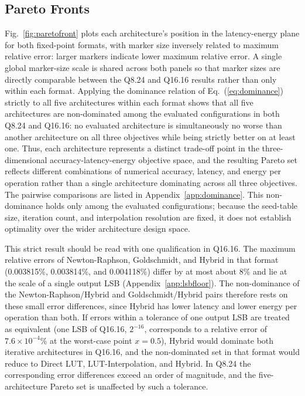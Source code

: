 \documentclass[manuscript,screen,review]{acmart}
\begin{document}
\subsection{Pareto Fronts}

Fig.~\ref{fig:paretofront} plots each architecture's position in the latency-energy plane for both fixed-point formats, with marker size inversely related to maximum relative error: larger markers indicate lower maximum relative error. A single global marker-size scale is shared across both panels so that marker sizes are directly comparable between the Q8.24 and Q16.16 results rather than only within each format. Applying the dominance relation of Eq.~(\ref{eq:dominance}) strictly to all five architectures within each format shows that all five architectures are non-dominated among the evaluated configurations in both Q8.24 and Q16.16: no evaluated architecture is simultaneously no worse than another architecture on all three objectives while being strictly better on at least one. Thus, each architecture represents a distinct trade-off point in the three-dimensional accuracy-latency-energy objective space, and the resulting Pareto set reflects different combinations of numerical accuracy, latency, and energy per operation rather than a single architecture dominating across all three objectives. The pairwise comparisons are listed in Appendix~\ref{app:dominance}. This non-dominance holds only among the evaluated configurations; because the seed-table size, iteration count, and interpolation resolution are fixed, it does not establish optimality over the wider architecture design space.

This strict result should be read with one qualification in Q16.16. The maximum relative errors of Newton-Raphson, Goldschmidt, and Hybrid in that format (0.003815\%, 0.003814\%, and 0.004118\%) differ by at most about 8\% and lie at the scale of a single output LSB (Appendix~\ref{app:lsbfloor}). The non-dominance of the Newton-Raphson/Hybrid and Goldschmidt/Hybrid pairs therefore rests on these small error differences, since Hybrid has lower latency and lower energy per operation than both. If errors within a tolerance of one output LSB are treated as equivalent (one LSB of Q16.16, $2^{-16}$, corresponds to a relative error of $7.6\times10^{-4}$\% at the worst-case point $x=0.5$), Hybrid would dominate both iterative architectures in Q16.16, and the non-dominated set in that format would reduce to Direct LUT, LUT-Interpolation, and Hybrid. In Q8.24 the corresponding error differences exceed an order of magnitude, and the five-architecture Pareto set is unaffected by such a tolerance.
\end{document}

